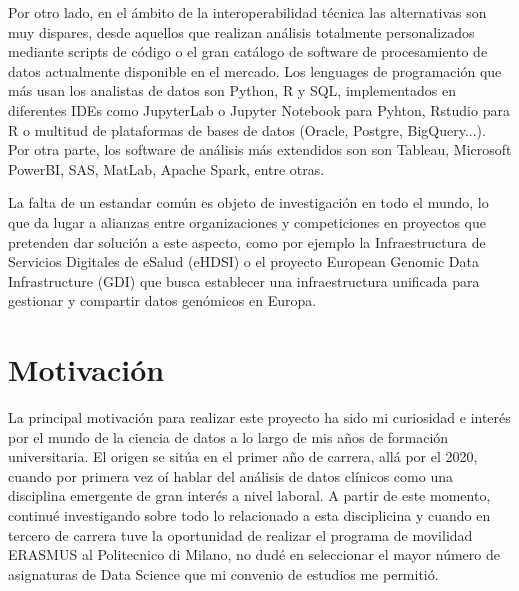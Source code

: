 Por otro lado, en el ámbito de la interoperabilidad técnica las alternativas son muy dispares, desde aquellos que realizan análisis totalmente personalizados mediante scripts de código o el gran catálogo de software de procesamiento de datos actualmente disponible en el mercado. Los lenguages de programación que más usan los analistas de datos son Python, R y SQL, implementados en diferentes IDEs como JupyterLab o Jupyter Notebook para Pyhton, Rstudio para R o multitud de plataformas de bases de datos (Oracle, Postgre, BigQuery...). Por otra parte, los software de análisis más extendidos son son Tableau, Microsoft PowerBI, SAS, MatLab, Apache Spark, entre otras. 

La falta de un estandar común es objeto de investigación en todo el mundo, lo que da lugar a alianzas entre organizaciones y competiciones en proyectos que pretenden dar solución a este aspecto, como por ejemplo la Infraestructura de Servicios Digitales de eSalud (eHDSI) \cite{DHE2023eHDSI} %
o el proyecto European Genomic Data Infrastructure (GDI) \cite{GDI2022GDI} que busca establecer una infraestructura unificada para gestionar y compartir datos genómicos en Europa.



\section{Motivación} \label{sec:01Motivacion}


La principal motivación para realizar este proyecto ha sido mi curiosidad e interés por el mundo de la ciencia de datos a lo largo de mis años de formación universitaria. El origen se sitúa en el primer año de carrera, allá por el 2020, cuando por primera vez oí hablar del análisis de datos clínicos como una disciplina emergente de gran interés a nivel laboral. A partir de este momento, continué investigando sobre todo lo relacionado a esta disciplicina y cuando en tercero de carrera tuve la oportunidad de realizar el programa de movilidad ERASMUS al Politecnico di Milano, no dudé en seleccionar el mayor número de asignaturas de Data Science que mi convenio de estudios me permitió. 

